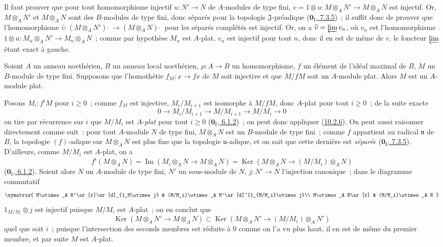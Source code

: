 Il faut prouver que pour tout homomorphisme injectif $u:N'\to N$ de
$A$-modules de type fini, $v=1\otimes u:M\otimes_A N'\to M\otimes_A N$ est
injectif. Or, $M\otimes_A N'$ et $M\otimes_A N$ sont des $B$-modules de type
fini, donc séparés pour la topologie $\mathfrak{J}$-préadique
(\hyperref[0.7.3.5-fr]{$\mathbf{0}_{\mathrm I}$, 7.3.5})~; il suffit donc de prouver que
l'homomorphisme
$\widehat v:(M\otimes_A N'){\,\widehat{\,}\,}\to(M\otimes_A N){\,\widehat{\,}\,}$ pour les
séparés complétés est injectif. Or, on a $\widehat v=\varprojlim v_n$, où
$v_n$ est l'homomorphisme $1\otimes u:M_n\otimes_A N'\to M_n\otimes_A N$~;
comme par hypothèse $M_n$ est $A$-plat, $v_n$ est injectif pour tout $n$, donc
il en est de même de $v$, le foncteur $\varprojlim$ étant exact à gauche.

\begin{corollary}[10.2.7]
\label{0.10.2.7-fr}
Soient $A$ un anneau noethérien, $B$ un anneau local noethérien,
$\rho:A\to B$ un homomorphisme, $f$ un élément de l'idéal maximal de $B$, $M$
un $B$-module de type fini. Supposons que l'homothétie
$f_M:x\to fx$ de $M$ soit injective et que $M/fM$ soit un $A$-module
plat. Alors $M$ est un $A$-module plat.
\end{corollary}

Posons $M_i:f^iM$ pour $i\geq0$~; comme $f_M$ est injective,
$M_i/M_{i+1}$ est isomorphe à $M/fM$, donc $A$-plat pour tout $i\geq0$~; de
la suite exacte
\[
  0\longrightarrow M_i/M_{i+1}\longrightarrow M/M_{i+1}
  \longrightarrow M/M_i\longrightarrow0
\]
on tire par récurrence sur $i$ que $M/M_i$ est $A$-\emph{plat} pour tout
$i\geq0$ (\hyperref[0.6.1.2-fr]{$\mathbf{0}_{\mathrm I}$, 6.1.2})~; on peut donc
appliquer (\hyperref[0.10.2.6-fr]{10.2.6}). On peut aussi raisonner directement
comme suit~: pour tout $A$-module $N$ de type fini, $M\otimes_A N$ est un
$B$-module de type fini~; comme $f$ appartient au radical $\mathfrak n$ de
$B$, la topologie $(f)$-adique sur $M\otimes_A N$ est plus fine que la
topologie $\mathfrak u$-adique, et on sait que cette dernière est \emph{séparée}
(\hyperref[0.7.3.5-fr]{$\mathbf{0}_{\mathrm I}$, 7.3.5}). D'ailleurs, comme $M/M_i$ est
$A$-plat, on a
\[
  f^i(M\otimes_A N)=\operatorname{Im}(M_i\otimes_A N\to M\otimes_A N)
  =\operatorname{Ker}(M\otimes_A N\to(M/M_i)\otimes_A N)
\]
(\hyperref[0.6.1.2-fr]{$\mathbf{0}_{\mathrm I}$, 6.1.2}). Soient alors $N$ un
$A$-module de type fini, $N'$ un sous-module de $N$, $j:N'\to N$ l'injection
canonique~; dans le diagramme commutatif
\[
\xymatrix{
  M\otimes_A N'\ar[r]\ar[d]_{1_M\otimes j} &
  (M/M_i)\otimes_A N'\ar[d]^{1_{M/M_i}\otimes j}\\
  M\otimes_A N\ar[r] & (M/M_i)\otimes_A N
}
\]
$1_{M/M_i}\otimes j$ est injectif puisque $M/M_i$ est $A$-plat~; on en
conclut que
\[
  \operatorname{Ker}(M\otimes_A N'\to M\otimes_A N)
  \subset\operatorname{Ker}(M\otimes_A N'\to(M/M_i)\otimes_A N')
\]
quel que soit $i$~; puisque l'intersection des seconds membres est réduite à
$0$ comme on l'a vu plus haut, il en est de même du premier membre, et par
suite $M$ est $A$-plat.

